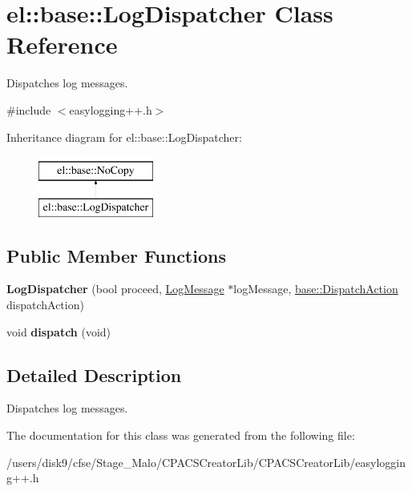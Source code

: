\hypertarget{classel_1_1base_1_1LogDispatcher}{\section{el\-:\-:base\-:\-:Log\-Dispatcher Class Reference}
\label{classel_1_1base_1_1LogDispatcher}
}


Dispatches log messages.  




{\ttfamily \#include $<$easylogging++.\-h$>$}

Inheritance diagram for el\-:\-:base\-:\-:Log\-Dispatcher\-:\begin{figure}[H]
\begin{center}
\leavevmode
\includegraphics[height=2.000000cm]{classel_1_1base_1_1LogDispatcher}
\end{center}
\end{figure}
\subsection*{Public Member Functions}
\begin{DoxyCompactItemize}
\item 
\hypertarget{classel_1_1base_1_1LogDispatcher_a21a9210cbaa93907f2e5519995dd26e2}{{\bfseries Log\-Dispatcher} (bool proceed, \hyperlink{classel_1_1LogMessage}{Log\-Message} $\ast$log\-Message, \hyperlink{namespaceel_1_1base_a3aa2563d38e47388ba242a1694fc2839}{base\-::\-Dispatch\-Action} dispatch\-Action)}\label{classel_1_1base_1_1LogDispatcher_a21a9210cbaa93907f2e5519995dd26e2}

\item 
\hypertarget{classel_1_1base_1_1LogDispatcher_a88d4a644364bb454136c85338f05da7a}{void {\bfseries dispatch} (void)}\label{classel_1_1base_1_1LogDispatcher_a88d4a644364bb454136c85338f05da7a}

\end{DoxyCompactItemize}


\subsection{Detailed Description}
Dispatches log messages. 

The documentation for this class was generated from the following file\-:\begin{DoxyCompactItemize}
\item 
/users/disk9/cfse/\-Stage\-\_\-\-Malo/\-C\-P\-A\-C\-S\-Creator\-Lib/\-C\-P\-A\-C\-S\-Creator\-Lib/easylogging++.\-h\end{DoxyCompactItemize}

